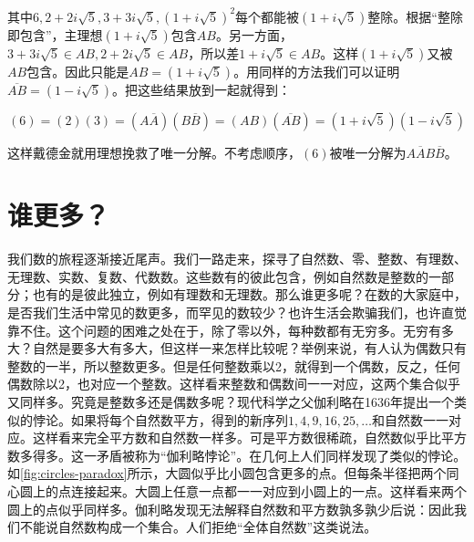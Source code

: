 \documentclass[b5paper]{ctexart}
\begin{document}
其中$6, 2 + 2i\sqrt{5}, 3 + 3i\sqrt{5}, (1 + i\sqrt{5})^2$每个都能被$(1 + i\sqrt{5})$整除。根据“整除即包含”，主理想$(1 + i\sqrt{5})$包含$AB$。另一方面，$3 + 3i\sqrt{5} \in AB, 2 + 2i\sqrt{5} \in AB$，所以差$1 + i\sqrt{5} \in AB$。这样$(1 + i\sqrt{5})$又被$AB$包含。因此只能是$AB = (1 + i\sqrt{5})$。用同样的方法我们可以证明$\overline{AB} = (1 - i\sqrt{5})$。把这些结果放到一起就得到：

\[
(6) = (2)(3) = (A\overline{A})(B\overline{B}) = (AB)(\overline{AB}) = (1 + i\sqrt{5})(1 - i\sqrt{5})
\]

这样戴德金就用理想挽救了唯一分解。不考虑顺序，$(6)$被唯一分解为$A\overline{A}B\overline{B}$。

\section{谁更多？}

我们数的旅程逐渐接近尾声。我们一路走来，探寻了自然数、零、整数、有理数、无理数、实数、复数、代数数。这些数有的彼此包含，例如自然数是整数的一部分；也有的是彼此独立，例如有理数和无理数。那么谁更多呢？在数的大家庭中，是否我们生活中常见的数更多，而罕见的数较少？也许生活会欺骗我们，也许直觉靠不住。这个问题的困难之处在于，除了零以外，每种数都有无穷多。无穷有多大？自然是要多大有多大，但这样一来怎样比较呢？举例来说，有人认为偶数只有整数的一半，所以整数更多。但是任何整数乘以2，就得到一个偶数，反之，任何偶数除以2，也对应一个整数。这样看来整数和偶数间一一对应，这两个集合似乎又同样多。究竟是整数多还是偶数多呢？现代科学之父伽利略在1636年提出一个类似的悖论。如果将每个自然数平方，得到的新序列$1, 4, 9, 16, 25, \dotsc$和自然数一一对应。这样看来完全平方数和自然数一样多。可是平方数很稀疏，自然数似乎比平方数多得多。这一矛盾被称为“伽利略悖论”。在几何上人们同样发现了类似的悖论。如\cref{fig:circles-paradox}所示，大圆似乎比小圆包含更多的点。但每条半径把两个同心圆上的点连接起来。大圆上任意一点都一一对应到小圆上的一点。这样看来两个圆上的点似乎同样多。伽利略发现无法解释自然数和平方数孰多孰少后说：因此我们不能说自然数构成一个集合。人们拒绝“全体自然数”这类说法。
\end{document}
